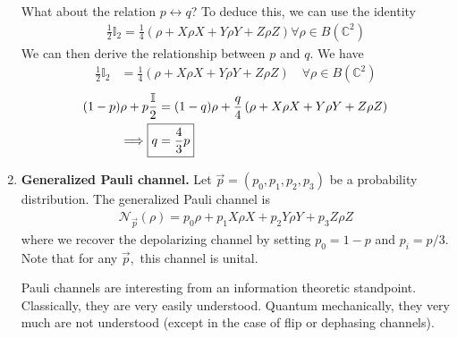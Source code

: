 \documentclass[10pt,oneside,longbibliography]{report}
\begin{document}
\begin{enumerate}
What about the relation $p \leftrightarrow q$? To deduce this, we can use the identity 
\begin{align}
    \frac{1}{2}\mathbb{I}_2 = \frac{1}{4} \left(\rho + X \rho X + Y\rho Y + Z \rho Z\right) \forall \rho \in B(\mathbb{C}^2)
\end{align}
We can then derive the relationship between $p$ and $q$. We have
\begin{align}
    \frac{1}{2} \mathbb{I}_2 &= \frac{1}{4}\left(\rho + X\rho X + Y \rho Y + Z\rho Z\right)\quad \forall \rho \in B(\mathbb{C}^2)
\end{align}
\begin{align}
    (1-p) \rho +p \frac{\mathbb{I}}{2}&=(1-q)\rho + \frac{q}{4}\left(\rho + X\rho X + Y\rho Y +Z \rho Z \right)\\
    \implies \Aboxed{q&=\frac{4}{3}p}
\end{align}

\item \textbf{Generalized Pauli channel.} Let $\vec{p}=(p_0,p_1,p_2,p_3)$ be a probability distribution. The generalized Pauli channel is 
\begin{align}
    \mathcal{N}_{\vec{p}}(\rho) = p_0 \rho + p_1 X \rho X + p_2 Y \rho Y + p_3 Z \rho Z
\end{align}
where we recover the depolarizing channel by setting $p_0=1-p$ and $p_i = p/3$. Note that for any $\vec{p},$ this channel is unital.

Pauli channels are interesting from an information theoretic standpoint. Classically, they are very easily understood. Quantum mechanically, they very much are not understood (except in the case of flip or dephasing channels).
\end{enumerate}
\end{document}
